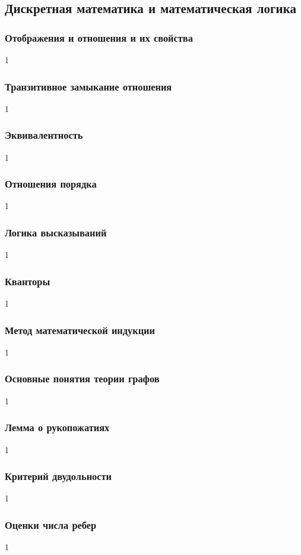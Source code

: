 \documentclass[12pt]{matmex-diploma}
\begin{document}
    \subsection{Дискретная математика и математическая логика}
    
        \subsubsection*{Отображения и отношения и их свойства}
            1
        \subsubsection*{Транзитивное замыкание отношения}
            1
        \subsubsection*{Эквивалентность}
            1
        \subsubsection*{Отношения порядка}
            1
        \subsubsection*{Логика высказываний}
            1
        \subsubsection*{Кванторы}
            1
        \subsubsection*{Метод математической индукции}
            1
        \subsubsection*{Основные понятия теории графов}
            1
        \subsubsection*{Лемма о рукопожатиях}
            1
        \subsubsection*{Критерий двудольности}
            1
        \subsubsection*{Оценки числа ребер}
            1
\end{document}
